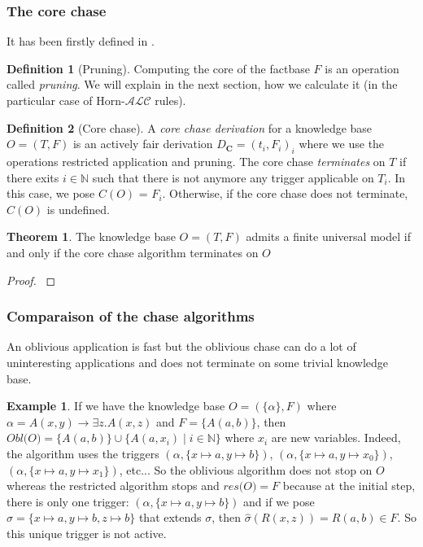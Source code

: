 \documentclass{article}
\theoremstyle{definition}
\newtheorem{definition}{Definition}[section]
\newtheorem{theorem}{Theorem}[section]
\newtheorem{example}{Example}[section]
\theoremstyle{remark}
\def \N {\mathbb N}
\begin{document}
\subsubsection{The core chase}

It has been firstly defined in \cite{core_chase}.

\begin{definition}[Pruning]
Computing the core of the factbase $F$ is an operation called \emph{pruning}. We will explain in the next section, how we calculate it (in the particular case of Horn-$\mathcal{ALC}$ rules).

\end{definition} 

\begin{definition}[Core chase]
A \emph{core chase derivation} for a knowledge base $O = (T,F)$ is an actively fair derivation $D_{\textbf{C}} = (t_i,F_i)_{i}$ where we  use the operations restricted application and pruning. The core chase \emph{terminates} on $T$ if there exits $i \in \N$ such that there is not anymore any trigger applicable on $T_i$. In this case, we pose \emph{$\textit{C}(O)$} = $F_i$. Otherwise, if the core chase does not terminate,$\textit{C}(O)$ is undefined.
\end{definition} 

\begin{theorem}
The knowledge base $O = (T,F)$ admits a finite universal model if and only if the core chase algorithm terminates on $O$
\end{theorem}

\begin{proof}
\cite{core_chase}
\end{proof}

\subsubsection{Comparaison of the chase algorithms}

An oblivious application is fast but the oblivious chase  can do a lot of uninteresting applications and does not terminate on some trivial knowledge base. 
\begin{example}
If we have the knowledge base $O=(\{\alpha\},F)$ where $\alpha = A(x,y) \rightarrow \exists z.A(x,z)$ and $F =  \{A(a,b)\}$, then $\textit{Obl(O)}= \{A(a,b)\}\cup\{A(a,x_i) \mid i \in \N\}$ where $x_i$ are new variables. Indeed, the algorithm uses the triggers $(\alpha, \{x \mapsto a, y \mapsto b\})$, $(\alpha, \{x \mapsto a, y \mapsto x_0\})$,$(\alpha, \{x \mapsto a, y \mapsto x_1\})$, etc...
So the oblivious algorithm does not stop on $O$ whereas the restricted algorithm stops and $\textit{res(O)} = F$ because at the initial step, there is only one trigger: $(\alpha, \{x \mapsto a, y \mapsto b\})$ and if we pose $\hat \sigma = \{x \mapsto a, y \mapsto b, z \mapsto b\}$ that extends $\sigma$, then $\hat \sigma(R(x,z))=R(a,b) \in F$. So this unique trigger is not active.
\end{example}
\end{document}
